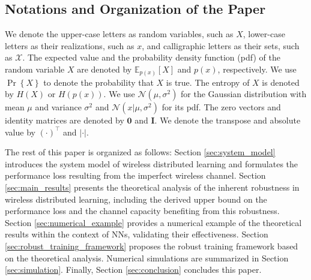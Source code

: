 \documentclass[lettersize,journal]{IEEEtran}
\newcommand{\E}{\mathbb{E}}
\theoremstyle{definition}
\theoremstyle{plain}
\begin{document}
\subsection{Notations and Organization of the Paper}
We denote the upper-case letters as random variables, such as $X$, lower-case letters as their realizations, such as $x$, and calligraphic letters as their sets, such as $\mathcal
X$. The expected value and the probability density function (pdf) of the random variable $X$ are denoted by $\E_{p(x)}\left[X\right]$ and $p(x)$, respectively. We use $\Pr\left\{X\right\}$ to denote the probability that $X$ is true. The entropy of $X$ is denoted by $H(X)$ or $H(p(x))$. We use $\mathcal{N}(\mu,\sigma^2)$ for the Gaussian distribution with mean $\mu$ and variance $\sigma^2$ and $\mathcal{N}(x|\mu,\sigma^2)$ for its pdf. The zero vectors and identity matrices are denoted by $\mathbf{0}$ and $\mathbf{I}$. We denote the transpose and absolute value by $(\cdot)^\top$ and $\left|\cdot\right|$. 


The rest of this paper is organized as follows: Section \ref{sec:system_model} introduces the system model of wireless distributed learning and formulates the performance loss resulting from the imperfect wireless channel. 
Section \ref{sec:main_results} presents the theoretical analysis of the inherent robustness in wireless distributed learning, including the derived upper bound on the performance loss and the channel capacity benefiting from this robustness. Section \ref{sec:numerical_example} provides a numerical example of the theoretical results within the context of NNs, validating their effectiveness. Section \ref{sec:robust_training_framework} proposes the robust training framework based on the theoretical analysis. Numerical simulations are summarized in Section \ref{sec:simulation}. Finally, Section \ref{sec:conclusion} concludes this paper.
\end{document}
